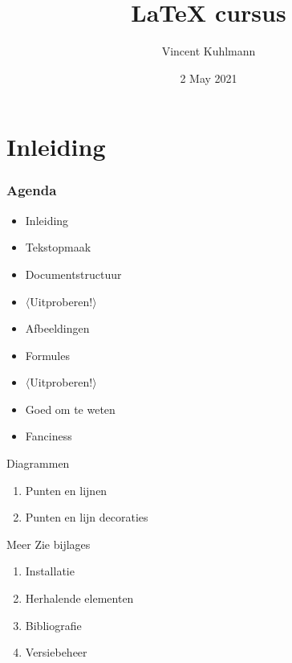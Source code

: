 

\title{\LaTeX{} cursus}
\author{Vincent Kuhlmann}
\date{2 May 2021}



\section{Inleiding}

\begin{frame}
	\titlepage
	\centering
\end{frame}


\begin{frame}
	\frametitle{Agenda}
	
	\begin{itemize}
		\item Inleiding
		\item Tekstopmaak
		\item Documentstructuur
		\item $ \langle $Uitproberen!$ \rangle $
		\item Afbeeldingen
		\item Formules
		\item $ \mathbf\langle $Uitproberen!$ \rangle $
		\item Goed om te weten
		\item Fanciness
	\end{itemize}
\end{frame}











\begin{frame}{Diagrammen}
	\begin{enumerate}
		\item Punten en lijnen
		\item Punten en lijn decoraties
	\end{enumerate}
\end{frame}

\begin{frame}{Meer}
	Zie bijlages
	\begin{enumerate}
		\item Installatie
		\item Herhalende elementen
		\item Bibliografie
		\item Versiebeheer
	\end{enumerate}
\end{frame}


	

